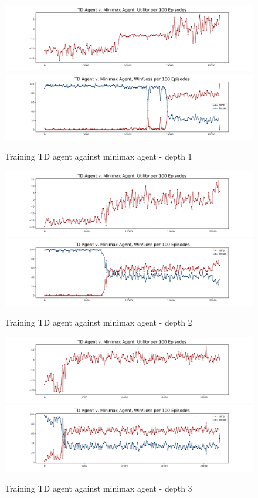\documentclass{article}
\begin{document}
\begin{figure}[H]
    \centering
    \includegraphics[scale=0.4]{td_minimax_1_pure_arena_772_util.png}
    \includegraphics[scale=0.4]{td_minimax_1_pure_arena_772_winloss.png}
    \caption{Training TD agent against minimax agent - depth 1}
\end{figure}

\begin{figure}[H]
    \centering
    \includegraphics[scale=0.4]{td_minimax_2_pure_util.png}
    \includegraphics[scale=0.4]{td_minimax_2_pure_winloss.png}
    \caption{Training TD agent against minimax agent - depth 2}
\end{figure}


\begin{figure}[H]
    \centering
    \includegraphics[scale=0.4]{td_minimax_4_pure_util.png}
    \includegraphics[scale=0.4]{td_minimax_4_pure_winloss.png}
    \caption{Training TD agent against minimax agent - depth 3}
\end{figure}
\end{document}

